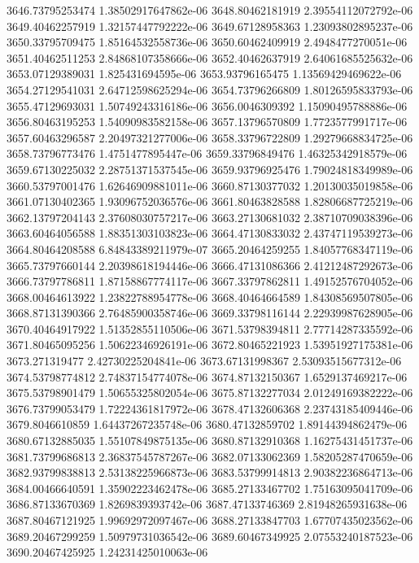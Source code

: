 {3646.73795253474 1.38502917647862e-06
3648.80462181919 2.39554112072792e-06
3649.40462257919 1.32157447792222e-06
3649.67128958363 1.23093802895237e-06
3650.33795709475 1.85164532558736e-06
3650.60462409919 2.4948477270051e-06
3651.40462511253 2.84868107358666e-06
3652.40462637919 2.64061685525632e-06
3653.07129389031 1.825431694595e-06
3653.93796165475 1.13569429469622e-06
3654.27129541031 2.64712598625294e-06
3654.73796266809 1.80126595833793e-06
3655.47129693031 1.50749243316186e-06
3656.0046309392 1.15090495788886e-06
3656.80463195253 1.54090983582158e-06
3657.13796570809 1.7723577991717e-06
3657.60463296587 2.20497321277006e-06
3658.33796722809 1.29279668834725e-06
3658.73796773476 1.4751477895447e-06
3659.33796849476 1.46325342918579e-06
3659.67130225032 2.28751371537545e-06
3659.93796925476 1.79024818349989e-06
3660.53797001476 1.62646909881011e-06
3660.87130377032 1.20130035019858e-06
3661.07130402365 1.93096752036576e-06
3661.80463828588 1.82806687725219e-06
3662.13797204143 2.37608030757217e-06
3663.27130681032 2.38710709038396e-06
3663.60464056588 1.88351303103823e-06
3664.47130833032 2.43747119539273e-06
3664.80464208588 6.84843389211979e-07
3665.20464259255 1.84057768347119e-06
3665.73797660144 2.20398618194446e-06
3666.47131086366 2.41212487292673e-06
3666.73797786811 1.87158867774117e-06
3667.33797862811 1.49152576704052e-06
3668.00464613922 1.23822788954778e-06
3668.40464664589 1.84308569507805e-06
3668.87131390366 2.76485900358746e-06
3669.33798116144 2.22939987628905e-06
3670.40464917922 1.51352855110506e-06
3671.53798394811 2.77714287335592e-06
3671.80465095256 1.50622346926191e-06
3672.80465221923 1.53951927175381e-06
3673.271319477 2.42730225204841e-06
3673.67131998367 2.53093515677312e-06
3674.53798774812 2.74837154774078e-06
3674.87132150367 1.6529137469217e-06
3675.53798901479 1.50655325802054e-06
3675.87132277034 2.01249169382222e-06
3676.73799053479 1.72224361817972e-06
3678.47132606368 2.23743185409446e-06
3679.8046610859 1.64437267235748e-06
3680.47132859702 1.89144394862479e-06
3680.67132885035 1.55107849875135e-06
3680.87132910368 1.16275431451737e-06
3681.73799686813 2.36837545787267e-06
3682.07133062369 1.58205287470659e-06
3682.93799838813 2.53138225966873e-06
3683.53799914813 2.90382236864713e-06
3684.00466640591 1.35902223462478e-06
3685.27133467702 1.75163095041709e-06
3686.87133670369 1.8269839393742e-06
3687.47133746369 2.81948265931638e-06
3687.80467121925 1.99692972097467e-06
3688.27133847703 1.67707435023562e-06
3689.20467299259 1.50979731036542e-06
3689.60467349925 2.07553240187523e-06
3690.20467425925 1.24231425010063e-06
}
